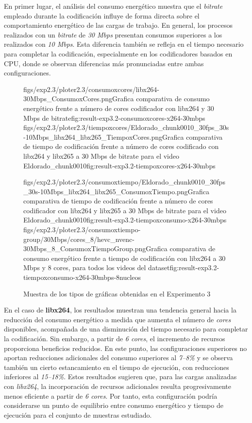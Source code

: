  En primer lugar, el análisis del consumo energético muestra que el \textit{bitrate} empleado durante la codificación influye de forma directa sobre el comportamiento energético de las cargas de trabajo. En general, los procesos realizados con un \textit{bitrate} de \textit{30 Mbps} presentan consumos superiores a los realizados con \textit{10 Mbps}. Esta diferencia también se refleja en el tiempo necesario para completar la codificación, especialmente en los codificadores basados en CPU, donde se observan diferencias más pronunciadas entre ambas configuraciones.

 \begin{figure}[H]
   \dosubfigs
        {figs/exp2.3/ploter2.3/consumoxcores/libx264-30Mbps_ConsumoxCores.png}{Grafica comparativa de consumo energético frente a número de cores codificador con libx264 y 30 Mbps de bitrate}{fig:result-exp3.2-consumoxcores-x264-30mbps}
        {figs/exp2.3/ploter2.3/tiempoxcores/Eldorado_chunk0010_30fps_30s-10Mbps_libx264_libx265_TiempoxCores.png}{Grafica comparativa de tiempo de codificación frente a número de cores codificado con libx264 y libx265 a 30 Mbps de bitrate para el video Eldorado\_chunk0010}{fig:result-exp3.2-tiempoxcores-x264-30mbps}

   \dosubfigs
        {figs/exp2.3/ploter2.3/consumoxtiempo/Eldorado_chunk0010_30fps_30s-10Mbps_libx264_libx265_ConsumoxTiempo.png}{Grafica comparativa de tiempo de codificación frente a número de cores codificador con libx264 y libx265 a  30 Mbps de bitrate para el video Eldorado\_chunk0010}{fig:result-exp3.2-tiempoxconsumo-x264-30mbps}
        {figs/exp2.3/ploter2.3/consumoxtiempo-group/30Mbps/cores_8/hevc_nvenc-30Mbps_8_ConsumoxTiempoGroup.png}{Grafica comparativa de consumo energético frente a tiempo de codificación con libx264 a 30 Mbps y 8 cores, para todos los videos del dataset}{fig:result-exp3.2-tiempoxconsumo-x264-30mbps-8nucleos}
   \caption{Muestra de los tipos de gráficas obtenidas en el Experimento 3}
   \label{fig:result-exp3}
 \end{figure}

 En el caso de \textbf{libx264}, los resultados muestran una tendencia general hacia la reducción del consumo energético a medida que aumenta el número de \textit{cores} disponibles, acompañada de una disminución del tiempo necesario para completar la codificación. Sin embargo, a partir de \textit{6 cores}, el incremento de recursos proporciona beneficios reducidos. En este punto, las configuraciones superiores no aportan reducciones adicionales del consumo superiores al \textit{7--8\%} y se observa también un cierto estancamiento en el tiempo de ejecución, con reducciones inferiores al \textit{15--18\%}. Estos resultados sugieren que, para las cargas analizadas con \textit{libx264}, la incorporación de recursos adicionales resulta progresivamente menos eficiente a partir de \textit{6 cores}. Por tanto, esta configuración podría considerarse un punto de equilibrio entre consumo energético y tiempo de ejecución para el conjunto de muestras estudiado.

